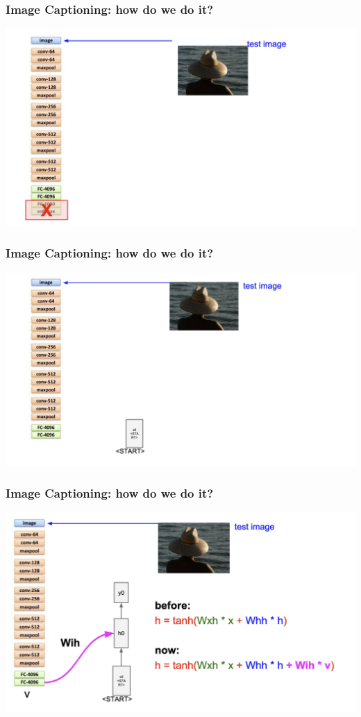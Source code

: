 \documentclass[aspectratio=1610]{beamer} %
\begin{document}
\begin{frame}
\frametitle{Image Captioning: how do we do it?}
\begin{center}
\includegraphics[width=.9\textwidth]{pics/cap3}
\end{center}
\end{frame}


\begin{frame}
\frametitle{Image Captioning: how do we do it?}
\begin{center}
\includegraphics[width=.9\textwidth]{pics/cap4}
\end{center}
\end{frame}

\begin{frame}
\frametitle{Image Captioning: how do we do it?}
\begin{center}
\includegraphics[width=.9\textwidth]{pics/cap5}
\end{center}
\end{frame}
\end{document}
